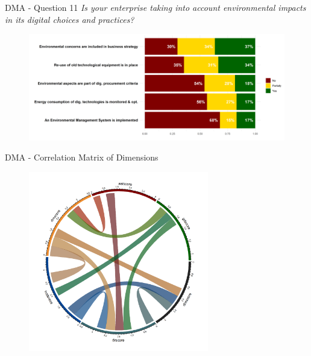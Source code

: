 \documentclass{beamer}
\begin{document}
    \begin{frame}{DMA - Question 11}
        \centering\textit{Is your enterprise taking into account environmental impacts in its digital choices and practices?}
        \begin{figure}
            \centering
            \includegraphics[width=\textwidth]{../Output/q11.png}
        \end{figure}
    \end{frame}
    
    \begin{frame}{DMA - Correlation Matrix of Dimensions}
        \begin{figure}
        \centering
        \includegraphics[width=0.7\textwidth]{../Output/theverysmallcorrmatrix_plot.png}
    \end{figure}
    \end{frame}
\end{document}
